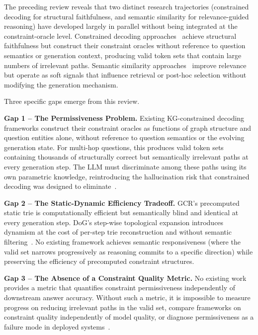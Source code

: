 The preceding review reveals that two distinct research trajectories (constrained decoding for structural faithfulness, and semantic similarity for relevance-guided reasoning) have developed largely in parallel without being integrated at the constraint-oracle level. Constrained decoding approaches~\citep{luo2024gcr, li2024dog} achieve structural faithfulness but construct their constraint oracles without reference to question semantics or generation context, producing valid token sets that contain large numbers of irrelevant paths. Semantic similarity approaches~\citep{shi2021kgpath, saxena2022kgqa, yuan2026routerkgqa} improve relevance but operate as soft signals that influence retrieval or post-hoc selection without modifying the generation mechanism.

Three specific gaps emerge from this review.

\textbf{Gap 1 -- The Permissiveness Problem.} Existing KG-constrained decoding frameworks construct their constraint oracles as functions of graph structure and question entities alone, without reference to question semantics or the evolving generation state. For multi-hop questions, this produces valid token sets containing thousands of structurally correct but semantically irrelevant paths at every generation step. The LLM must discriminate among these paths using its own parametric knowledge, reintroducing the hallucination risk that constrained decoding was designed to eliminate~\citep{luo2024gcr, li2024dog}.

\textbf{Gap 2 -- The Static-Dynamic Efficiency Tradeoff.} GCR's precomputed static trie is computationally efficient but semantically blind and identical at every generation step. DoG's step-wise topological expansion introduces dynamism at the cost of per-step trie reconstruction and without semantic filtering~\citep{li2024dog, willard2023outlines}. No existing framework achieves semantic responsiveness (where the valid set narrows progressively as reasoning commits to a specific direction) while preserving the efficiency of precomputed constraint structures.

\textbf{Gap 3 -- The Absence of a Constraint Quality Metric.} No existing work provides a metric that quantifies constraint permissiveness independently of downstream answer accuracy. Without such a metric, it is impossible to measure progress on reducing irrelevant paths in the valid set, compare frameworks on constraint quality independently of model quality, or diagnose permissiveness as a failure mode in deployed systems~\citep{luo2024gcr, li2024dog}.

